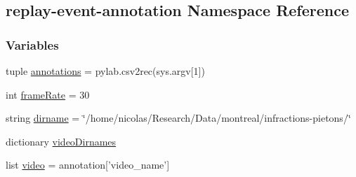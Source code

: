 \hypertarget{namespacereplay-event-annotation}{\subsection{replay-\/event-\/annotation Namespace Reference}
\label{namespacereplay-event-annotation}
}
\subsubsection*{Variables}
\begin{DoxyCompactItemize}
\item 
tuple \hyperlink{namespacereplay-event-annotation_aa9d30de64f986accd6450e022aa67577}{annotations} = pylab.\-csv2rec(sys.\-argv\mbox{[}1\mbox{]})
\item 
int \hyperlink{namespacereplay-event-annotation_a71eea50b81803515087ff66cbc3cdb68}{frame\-Rate} = 30
\item 
string \hyperlink{namespacereplay-event-annotation_aec1a96e110f52d9128022f8759551b05}{dirname} = \char`\"{}/home/nicolas/Research/Data/montreal/infractions-\/pietons/\char`\"{}
\item 
dictionary \hyperlink{namespacereplay-event-annotation_a2355d1bf8d72c28fc45e7e864ff43f5f}{video\-Dirnames}
\item 
list \hyperlink{namespacereplay-event-annotation_a2ab142bc2d897e17680b45c778eb5a3e}{video} = annotation\mbox{[}'video\-\_\-name'\mbox{]}
\end{DoxyCompactItemize}


